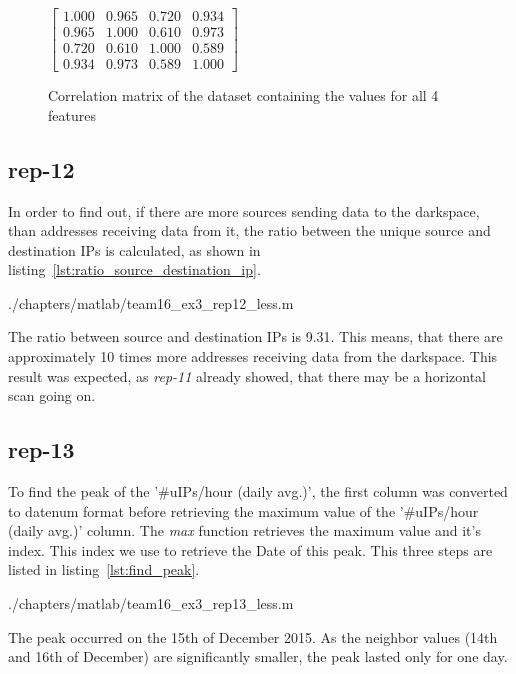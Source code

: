 \begin{figure}[H]
\center
$
\begin{bmatrix}
1.000 &  0.965 &  0.720 &  0.934 \\
0.965 &  1.000 &  0.610 &  0.973 \\
0.720 &  0.610 &  1.000 &  0.589 \\
0.934 &  0.973 &  0.589 &  1.000
\end{bmatrix}
$
\caption{ Correlation matrix of the dataset containing the values for all 4 features }
\label{fig:correlation}
\end{figure}

\subsection*{rep-12}
In order to find out, if there are more sources sending data to the darkspace, than addresses receiving data from it, the ratio between the unique source and destination IPs is calculated, as shown in listing~\ref{lst:ratio_source_destination_ip}.


				{./chapters/matlab/team16_ex3_rep12_less.m}


The ratio between source and destination IPs is 9.31. This means, that there are approximately 10 times more addresses receiving data from the darkspace. This result was expected, as \textit{rep-11} already showed, that there may be a horizontal scan going on.

\subsection*{rep-13}
To find the peak of the '\#uIPs/hour (daily avg.)', the first column was converted to datenum format before retrieving the maximum value of the '\#uIPs/hour (daily avg.)' column. The \textit{max} function retrieves the maximum value and it's index. This index we use to retrieve the Date of this peak. This three steps are listed in listing~\ref{lst:find_peak}.



				{./chapters/matlab/team16_ex3_rep13_less.m}


The peak occurred on the 15th of December 2015. As the neighbor values (14th and 16th of December) are significantly smaller, the peak lasted only for one day.

